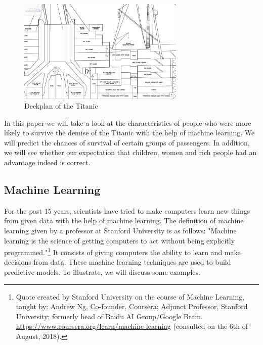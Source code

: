 \documentclass[11pt]{article}
\begin{document}
\begin{figure}[htbp]
\centering
\includegraphics[width=300px]{./Deck3.png}
\caption{\label{tab:titanicdeckplantwo}
Deckplan of the Titanic}
\end{figure} 


In this paper we will take a look at the characteristics of people who were more likely to survive the demise of the Titanic with the help of machine learning. We will predict the chances of survival of certain groups of passengers. In addition, we will see whether our expectation that children, women and rich people had an advantage indeed is correct. 

\subsection{Machine Learning}
\label{sec:orgd799a9f}
For the past 15 years, scientists have tried to make computers learn new things from given data with the help of machine learning. The definition of machine learning given by a professor at Stanford University is as follows: "Machine learning is the science of getting computers to act without being explicitly programmed."\footnote{Quote created by Stanford University on the course of Machine Learning, taught by: Andrew Ng, Co-founder, Coursera; Adjunct Professor, Stanford University; formerly head of Baidu AI Group/Google Brain. \url{https://www.coursera.org/learn/machine-learning} (consulted on the 6th of August, 2018).} It consists of giving computers the ability to learn and make decisions from data. These machine learning techniques are used to build predictive models. To illustrate, we will discuss some examples. 
\end{document}
